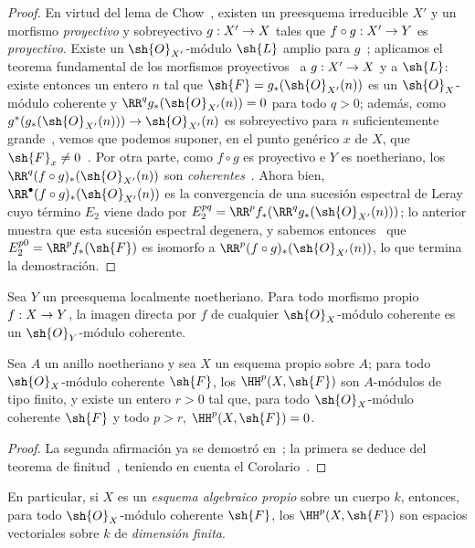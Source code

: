 \documentclass[oneside]{amsart}
\makeatletter
\newcommand{\ega@arrow}[2]{\mathchoice{#1}{#2}{#2}{#2}}
\renewcommand{\to}{\ega@arrow{\longrightarrow}{\rightarrow}}
\let\EGAOriginalLabel\label
\renewcommand{\label}[1]{\phantomsection\EGAOriginalLabel{#1}}
\makeatother
\begin{document}
\begin{proof}
En virtud del lema de Chow~, existen un preesquema irreducible $X'$ y un morfismo \emph{proyectivo} y sobreyectivo $g:X'\to X$ tales que $f\circ g:X'\to Y$ es \emph{proyectivo}.
Existe un $\sh{O}_{X'}$-módulo $\sh{L}$ amplio para $g$~; aplicamos el teorema fundamental de los morfismos proyectivos~ a $g:X'\to X$ y a $\sh{L}$: existe entonces un entero $n$ tal que $\sh{F}=g_*(\sh{O}_{X'}(n))$ es un $\sh{O}_X$-módulo coherente y $\RR^q g_*(\sh{O}_{X'}(n))=0$ para todo $q>0$; además, como $g^*(g_*(\sh{O}_{X'}(n)))\to\sh{O}_{X'}(n)$ es sobreyectivo para $n$ suficientemente grande~, vemos que podemos suponer, en el punto genérico $x$ de $X$, que $\sh{F}_x\neq 0$~.
Por otra parte, como $f\circ g$ es proyectivo e $Y$ es noetheriano, los $\RR^q(f\circ g)_*(\sh{O}_{X'}(n))$ son \emph{coherentes}~.
Ahora bien, $\RR^\bullet(f\circ g)_*(\sh{O}_{X'}(n))$ es la convergencia de una sucesión espectral de Leray cuyo término $E_2$ viene dado por $E_2^{pq}=\RR^p f_*(\RR^q g_*(\sh{O}_{X'}(n)))$; lo anterior muestra que esta sucesión espectral degenera, y sabemos entonces~ que $E_2^{p0}=\RR^p f_*(\sh{F})$ es isomorfo a $\RR^p(f\circ g)_*(\sh{O}_{X'}(n))$, lo que termina la demostración.
\end{proof}

\begin{corollary}[3.2.2]
\label{III.3.2.2}
Sea $Y$ un preesquema localmente noetheriano.
Para todo morfismo propio $f:X\to Y$, la imagen directa por $f$ de cualquier $\sh{O}_X$-módulo coherente es un $\sh{O}_Y$-módulo coherente.
\end{corollary}

\begin{corollary}[3.2.3]
\label{III.3.2.3}
Sea $A$ un anillo noetheriano y sea $X$ un esquema propio sobre $A$; para todo $\sh{O}_X$-módulo coherente $\sh{F}$, los $\HH^p(X,\sh{F})$ son $A$-módulos de tipo finito, y existe un entero $r>0$ tal que, para todo $\sh{O}_X$-módulo coherente $\sh{F}$ y todo $p>r$, $\HH^p(X,\sh{F})=0$.
\end{corollary}

\begin{proof}
La segunda afirmación ya se demostró en~; la primera se deduce del teorema de finitud~, teniendo en cuenta el Corolario~.
\end{proof}

En particular, si $X$ es un \emph{esquema algebraico propio} sobre un cuerpo $k$, entonces, para todo $\sh{O}_X$-módulo coherente $\sh{F}$, los $\HH^p(X,\sh{F})$ son espacios vectoriales sobre $k$ de \emph{dimensión finita}.
\end{document}
